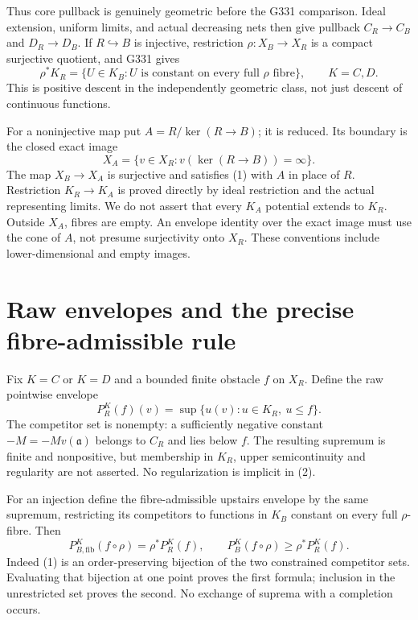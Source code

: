 Thus core pullback is genuinely geometric before the G331 comparison.
Ideal extension, uniform limits, and actual decreasing nets then give
pullback \(C_R\to C_B\) and \(D_R\to D_B\).
If \(R\hookrightarrow B\) is injective, restriction
\(\rho:X_B\to X_R\) is a compact surjective quotient, and G331 gives
\[
 \rho^*K_R=\{U\in K_B:U\text{ is constant on every full }\rho
                       \text{ fibre}\},\qquad K=C,D.                 \tag{1}
\]
This is positive descent in the independently geometric class,
not just descent of continuous functions.

For a noninjective map put \(A=R/\ker(R\to B)\); it is reduced.
Its boundary is the closed exact image
\[
 X_A=\{v\in X_R:v(\ker(R\to B))=\infty\}.
\]
The map \(X_B\to X_A\) is surjective and satisfies (1) with \(A\)
in place of \(R\). Restriction \(K_R\to K_A\) is proved directly
by ideal restriction and the actual representing limits. We do not
assert that every \(K_A\) potential extends to \(K_R\).
Outside \(X_A\), fibres are empty. An envelope identity over the
exact image must use the cone of \(A\), not presume surjectivity
onto \(X_R\). These conventions include lower-dimensional and empty
images.

\section{Raw envelopes and the precise fibre-admissible rule}
\label{sec:envelope}
Fix \(K=C\) or \(K=D\) and a bounded finite obstacle \(f\) on \(X_R\).
Define the raw pointwise envelope
\[
 P_R^K(f)(v)=\sup\{u(v):u\in K_R,\ u\leq f\}.
                                                               \tag{2}
\]
The competitor set is nonempty: a sufficiently negative constant
\(-M=-Mv(\mathfrak a)\) belongs to \(C_R\) and lies below \(f\).
The resulting supremum is finite and nonpositive, but membership
in \(K_R\), upper semicontinuity and regularity are not asserted.
No regularization is implicit in (2).

For an injection define the fibre-admissible upstairs envelope by
the same supremum, restricting its competitors to functions in
\(K_B\) constant on every full \(\rho\)-fibre. Then
\[
 P_{B,\mathrm{fib}}^K(f\circ\rho)=\rho^*P_R^K(f),\qquad
 P_B^K(f\circ\rho)\geq\rho^*P_R^K(f).                            \tag{3}
\]
Indeed (1) is an order-preserving bijection of the two constrained
competitor sets. Evaluating that bijection at one point proves the
first formula; inclusion in the unrestricted set proves the second.
No exchange of suprema with a completion occurs.

